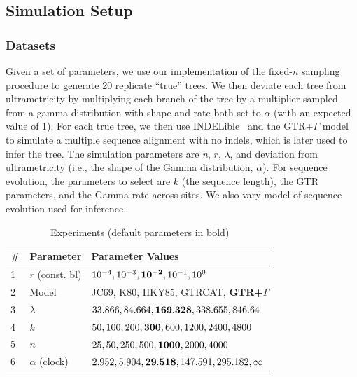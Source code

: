 \subsection{Simulation Setup}
\subsubsection{Datasets}
Given a set of parameters, we use our implementation of the fixed-$n$ sampling procedure to generate 20 replicate ``true'' trees. We then deviate each tree from ultrametricity by multiplying each branch of the tree by a multiplier sampled from a gamma distribution with shape and rate both set to $\alpha$ (with an expected value of 1). For each true tree, we then use INDELible~\cite{Fletcher2009} and the \gls{GTR}+$\Gamma$ model~\cite{Tavare1986} to simulate a multiple sequence alignment with no indels, which is later used to infer the tree. The simulation parameters are \textit{n}, $r$, $\lambda$, and deviation from ultrametricity (i.e., the shape of the Gamma distribution, $\alpha$). For sequence evolution, the parameters to select are $k$ (the sequence length), the \gls{GTR} parameters, and the Gamma rate across sites. We also vary model of sequence evolution used for inference.

\begin{table}[!ht] %
\caption[Experiments]{Experiments (default parameters in bold)}
\vspace{-0.25in}
\begin{center}
\begin{tabular}{|l|l|l|}
\hline
\textbf{\#}&\textbf{Parameter} & \textbf{Parameter Values}\\
\hline
1&$r$ (const. bl) & $10^{-4}, 10^{-3}, {\bf10^{-2}}, 10^{-1}, 10^{0}$\\
2& Model & JC69, K80, HKY85, GTRCAT, \textbf{GTR+$\Gamma$}\\
3&$\lambda$ & $33.866, 84.664, {\bf169.328}, 338.655, 846.64$\\
4&$k$ & $50, 100, 200, {\bf300}, 600, 1200, 2400, 4800$\\
5&$n$ & $25, 50, 250, 500, {\bf1000}, 2000, 4000$\\
6& $\alpha$ (clock) & $2.952, 5.904, {\bf29.518}, 147.591, 295.182, \infty$\\
\hline
\end{tabular}
\end{center}
\label{tab:dualbirth-experiments}
\end{table}


